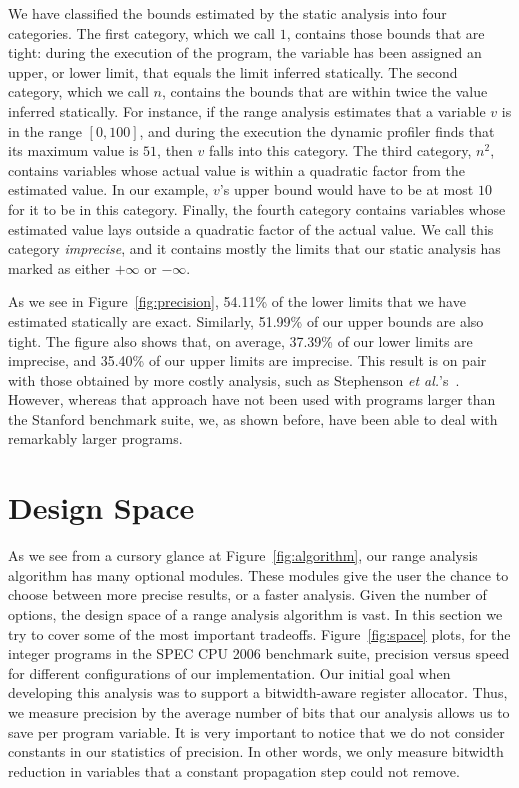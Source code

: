 \documentclass[times]{speauth}
\begin{document}
We have classified the bounds estimated by the static analysis into four
categories.
The first category, which we call $1$, contains those bounds that are tight:
during the execution of the program, the variable has been assigned an upper,
or lower limit, that equals the limit inferred statically.
The second category, which we call $n$, contains the bounds that are
within twice the value inferred statically.
For instance, if the range analysis estimates that a variable $v$ is in the
range $[0, 100]$, and during the execution the dynamic profiler finds that
its maximum value is $51$, then $v$ falls into this category.
The third category, $n^2$, contains variables whose actual value is within
a quadratic factor from the estimated value.
In our example, $v$'s upper bound would have to be at most $10$ for it to
be in this category.
Finally, the fourth category contains variables whose estimated value lays
outside a quadratic factor of the actual value.
We call this category {\em imprecise}, and it contains mostly the limits that
our static analysis has marked as either $+\infty$ or $-\infty$.

As we see in Figure~\ref{fig:precision}, 54.11\% of the lower limits that
we have estimated statically are exact.
Similarly, 51.99\% of our upper bounds are also tight.
The figure also shows that, on average, 37.39\% of our lower limits are
imprecise, and 35.40\% of our upper limits are imprecise.
This result is on pair with those obtained by more costly analysis, such as
Stephenson {\em et al.}'s~\cite{Stephenson00}.
However, whereas that approach have not been used with programs larger than
the Stanford benchmark suite, we, as shown before, have been able to
deal with remarkably larger programs.

\section{Design Space}
\label{sec:design}

As we see from a cursory glance at Figure~\ref{fig:algorithm}, our range
analysis algorithm has many optional modules.
These modules give the user the chance to choose between more precise results,
or a faster analysis.
Given the number of options, the design space of a range analysis algorithm
is vast.
In this section we try to cover some of the most important tradeoffs.
Figure~\ref{fig:space} plots, for the integer programs in the SPEC CPU 2006
benchmark suite, precision versus speed for different configurations of
our implementation.
Our initial goal when developing this analysis was to support a bitwidth-aware
register allocator.
Thus, we measure precision by the average number of bits that our
analysis allows us to save per program variable.
It is very important to notice that we do not consider constants in our statistics of precision.
In other words, we only measure bitwidth reduction in variables that a constant
propagation step could not remove.
\end{document}
